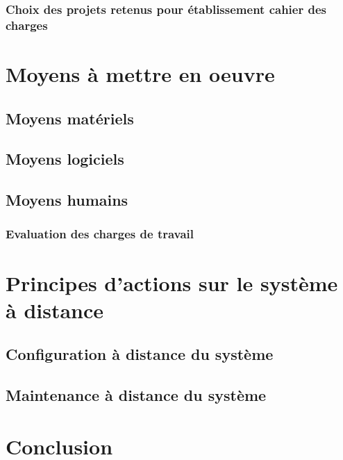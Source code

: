 \subsubsection{Choix des projets retenus pour établissement cahier des charges}

\section{Moyens à mettre en oeuvre}
\subsection{Moyens matériels}
\subsection{Moyens logiciels}
\subsection{Moyens humains}
\subsubsection{Evaluation des charges de travail}

\section{Principes d'actions sur le système à distance}
\subsection{Configuration à distance du système}
\subsection{Maintenance à distance du système}
\section{Conclusion}






